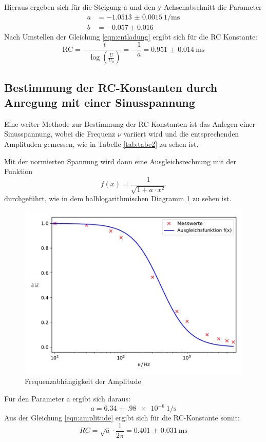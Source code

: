 \noindent Hieraus ergeben sich für die Steigung a und den y-Achsenabschnitt die Parameter
\begin{align*}
  a&= \SI{-1.0513(15)}{1\per\milli\second} \\
  b&= -0.057 \pm 0.016
\end{align*}
Nach Umstellen der Gleichung \ref{eqn:entladung} ergibt sich für die RC Konstante:
\begin{equation}
  \text{RC} = -\frac{t}{\log\left({\frac{U}{U_0}}\right)} = -\frac{1}{a} =
  \SI{0.951(14)}{\milli\second}
\end{equation}
\subsection{Bestimmung der RC-Konstanten durch Anregung mit einer Sinusspannung}
Eine weiter Methode zur Bestimmung der RC-Konstanten ist das Anlegen einer
Sinusspannung, wobei die Frequenz $ \nu $ variiert wird und die entsprechenden
Amplituden gemessen, wie in Tabelle \ref{tab:tabe2} zu sehen ist.

\noindent Mit der normierten Spannung wird dann eine Ausgleichsrechnung mit der Funktion
\begin{equation}
  f(x)= \frac{1}{\sqrt{1+a\cdot x^2}}
\end{equation}
durchgeführt, wie in dem halblogarithmischen Diagramm \ref{fig:Ampl} zu sehen ist.
\begin{figure}[H]
  \centering
  \includegraphics{plot2.pdf}
  \caption{Frequenzabhängigkeit der Amplitude}
  \label{fig:Ampl}
\end{figure}
\noindent Für den Parameter a ergibt sich daraus:
\begin{equation*}
  a= \SI{6.34(98)e-6}{1\per\second}
\end{equation*}
Aus der Gleichung \ref{eqn:amplitude} ergibt sich für die RC-Konstante
somit:
\begin{equation}
  RC = \sqrt{a} \cdot \frac{1}{2\pi}=\SI{0.401(31)}{\milli\second}
\end{equation}
